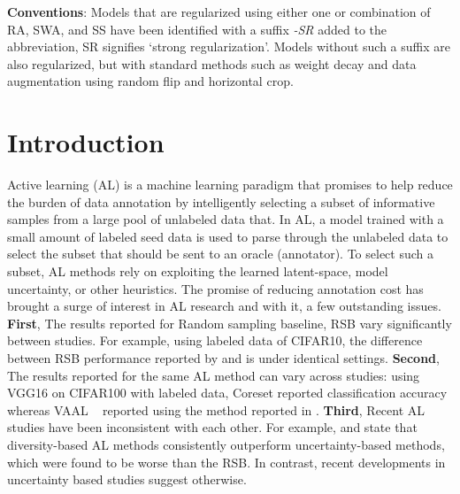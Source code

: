 \documentclass[10pt,twocolumn,letterpaper]{article}
\begin{document}
\hspace{-6.4mm}\textbf{Conventions}: Models that are regularized using either one or combination of RA, SWA, and SS have been identified with a suffix \textit{-SR} added to the abbreviation, SR signifies `strong regularization'. Models without such a suffix are also regularized, but with standard methods such as weight decay and data augmentation using random flip and horizontal crop.

\section{Introduction}
\label{sec:intro}

Active learning (AL) is a machine learning paradigm that promises to help reduce the burden of data annotation by intelligently selecting a subset of informative samples from a large pool of unlabeled data that. In AL, a model trained with a small amount of labeled seed data is used to parse through the unlabeled data to select the subset that should be sent to an oracle (annotator). To select such a subset, AL methods rely on exploiting the learned latent-space, model uncertainty, or other heuristics. The promise of reducing annotation cost has brought a surge of interest in AL research \cite{VAAL_sinha2019variational, coreset_sener2018active, Ensembles_Beluch2018ThePO, DBAL_gal2017deep,BatchBald_DBLP:journals/corr/abs-1906-08158, BGALD_DBLP:journals/corr/abs-1904-11643,yoo2019learning_loss_for_AL,coregcn_caramalau2021sequential, tavaal_kim2021task} and with it, a few outstanding issues.
\textbf{First}, The results reported for Random sampling baseline, RSB vary significantly between studies. For example, using  labeled data of CIFAR10, the difference between RSB performance reported by \cite{yoo2019learning_loss_for_AL} and \cite{BGALD_DBLP:journals/corr/abs-1904-11643} is  under identical settings. 
\textbf{Second}, 
The results reported for the same AL method can vary across studies: using VGG16 \cite{vgg16_simonyan2014very} on CIFAR100 \cite{cifar10_dataset_krizhevsky2009learning} with  labeled data, Coreset \cite{coreset_sener2018active} reported  classification accuracy whereas VAAL ~\cite{VAAL_sinha2019variational} reported  using the method reported in \cite{coreset_sener2018active}. 
\textbf{Third}, Recent AL studies have been inconsistent with each other. For example, \cite{coreset_sener2018active} and \cite{Adv_AL_DBLP:journals/corr/abs-1802-09841} state that diversity-based AL methods consistently outperform uncertainty-based methods, which were found to be worse than the RSB. In contrast, recent developments in uncertainty based studies \cite{yoo2019learning_loss_for_AL} suggest otherwise.
\end{document}
